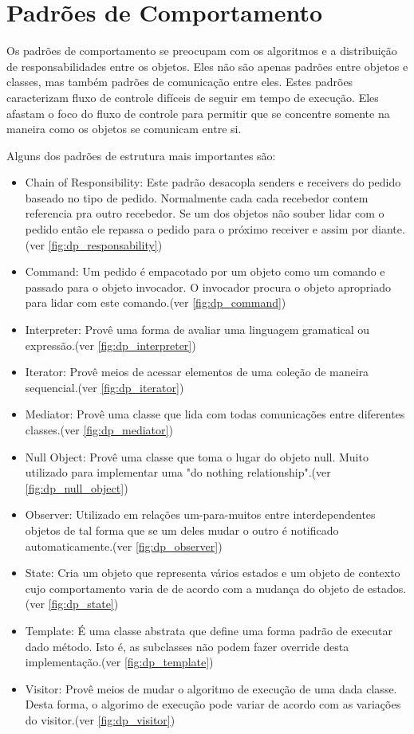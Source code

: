 \section{Padrões de Comportamento}
Os padrões de comportamento se preocupam com os algoritmos e a distribuição de responsabilidades entre os objetos. Eles não são apenas padrões entre objetos e classes, mas também padrões de comunicação entre eles. Estes padrões caracterizam fluxo de controle difíceis de seguir em tempo de execução. Eles afastam o foco do fluxo de controle para permitir que se concentre somente na maneira como os objetos se comunicam entre si.

Alguns dos padrões de estrutura mais importantes são:
\begin{itemize}
	\item Chain of Responsibility: Este padrão desacopla senders e receivers do pedido baseado no tipo de pedido. Normalmente cada cada recebedor contem referencia pra outro recebedor. Se um dos objetos não souber lidar com o pedido então ele repassa o pedido para o próximo receiver e assim por diante. (ver \autoref{fig:dp_responsability})
	\item Command: Um pedido é empacotado por um objeto como um comando e passado para o objeto invocador. O invocador procura o objeto apropriado para lidar com este comando.(ver \autoref{fig:dp_command})
	\item Interpreter: Provê uma forma de avaliar uma linguagem gramatical ou expressão.(ver \autoref{fig:dp_interpreter})
	\item Iterator: Provê meios de acessar elementos de uma coleção de maneira sequencial.(ver \autoref{fig:dp_iterator})
	\item Mediator: Provê uma classe que lida com todas comunicações entre diferentes classes.(ver \autoref{fig:dp_mediator})
	\item Null Object: Provê uma classe que toma o lugar do objeto null. Muito utilizado para implementar uma "do nothing relationship".(ver \autoref{fig:dp_null_object})
	\item Observer: Utilizado em relações um-para-muitos entre interdependentes objetos de tal forma que se um deles mudar o outro é notificado automaticamente.(ver \autoref{fig:dp_observer})
	\item State: Cria um objeto que representa vários estados e um objeto de contexto cujo comportamento varia de de acordo com a mudança do objeto de estados.(ver \autoref{fig:dp_state})
	\item Template: É uma classe abstrata que define uma forma padrão de executar dado método. Isto é, as subclasses não podem fazer override desta implementação.(ver \autoref{fig:dp_template})
	\item Visitor:  Provê meios de mudar o algoritmo de execução de uma dada classe. Desta forma, o algorimo de execução pode variar de acordo com as variações do visitor.(ver \autoref{fig:dp_visitor})
\end{itemize}


